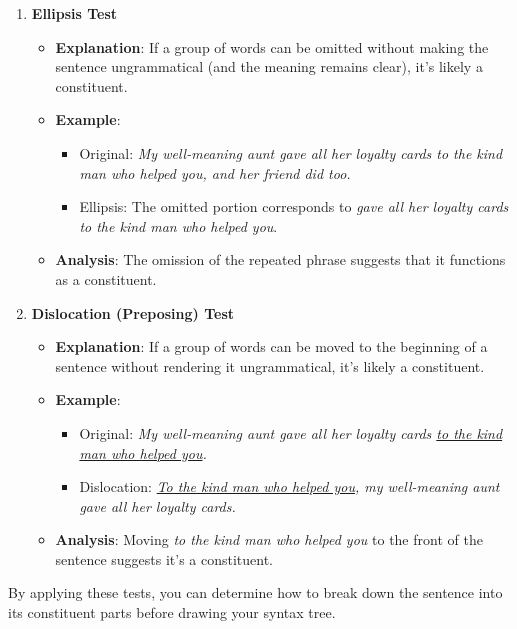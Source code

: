 \begin{enumerate}[noitemsep]
    \item \textbf{Ellipsis Test}
    \begin{itemize}[noitemsep]
        \item \textbf{Explanation}: If a group of words can be omitted without making the sentence ungrammatical (and the meaning remains clear), it's likely a constituent.
        \item \textbf{Example}:
        \begin{itemize}[noitemsep]
            \item Original: \textit{My well-meaning aunt gave all her loyalty cards to the kind man who helped you, and her friend did too.}
            \item Ellipsis: The omitted portion corresponds to \textit{gave all her loyalty cards to the kind man who helped you}.
        \end{itemize}
        \item \textbf{Analysis}: The omission of the repeated phrase suggests that it functions as a constituent.
    \end{itemize}
    
    \item \textbf{Dislocation (Preposing) Test}
    \begin{itemize}[noitemsep]
        \item \textbf{Explanation}: If a group of words can be moved to the beginning of a sentence without rendering it ungrammatical, it's likely a constituent.
        \item \textbf{Example}:
        \begin{itemize}[noitemsep]
            \item Original: \textit{My well-meaning aunt gave all her loyalty cards \underline{to the kind man who helped you}.}
            \item Dislocation: \textit{\underline{To the kind man who helped you}, my well-meaning aunt gave all her loyalty cards.}
        \end{itemize}
        \item \textbf{Analysis}: Moving \textit{to the kind man who helped you} to the front of the sentence suggests it's a constituent.
    \end{itemize}
\end{enumerate}

By applying these tests, you can determine how to break down the sentence into its constituent parts before drawing your syntax tree.

